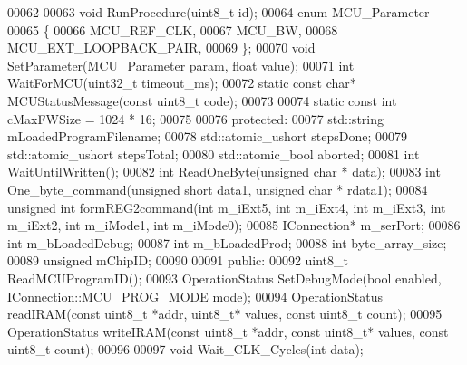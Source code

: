 \begin{DoxyCode}
00062 
00063         \textcolor{keywordtype}{void} RunProcedure(uint8\_t \textcolor{keywordtype}{id});
00064         \textcolor{keyword}{enum} MCU_Parameter
00065         \{
00066             MCU_REF_CLK,
00067             MCU_BW,
00068             MCU_EXT_LOOPBACK_PAIR,
00069         \};
00070         \textcolor{keywordtype}{void} SetParameter(MCU_Parameter param, \textcolor{keywordtype}{float} value);
00071         \textcolor{keywordtype}{int} WaitForMCU(uint32\_t timeout_ms);
00072         \textcolor{keyword}{static} \textcolor{keyword}{const} \textcolor{keywordtype}{char}* MCUStatusMessage(\textcolor{keyword}{const} uint8\_t code);
00073 
00074         \textcolor{keyword}{static} \textcolor{keyword}{const} \textcolor{keywordtype}{int} cMaxFWSize = 1024 * 16;
00075 
00076     \textcolor{keyword}{protected}:
00077         std::string mLoadedProgramFilename;
00078         std::atomic\_ushort stepsDone;
00079         std::atomic\_ushort stepsTotal;
00080         std::atomic\_bool aborted;
00081         \textcolor{keywordtype}{int} WaitUntilWritten();
00082         \textcolor{keywordtype}{int} ReadOneByte(\textcolor{keywordtype}{unsigned} \textcolor{keywordtype}{char} * data);
00083         \textcolor{keywordtype}{int} One_byte_command(\textcolor{keywordtype}{unsigned} \textcolor{keywordtype}{short} data1, \textcolor{keywordtype}{unsigned} \textcolor{keywordtype}{char} * rdata1);
00084         \textcolor{keywordtype}{unsigned} \textcolor{keywordtype}{int} formREG2command(\textcolor{keywordtype}{int} m\_iExt5, \textcolor{keywordtype}{int} m\_iExt4, \textcolor{keywordtype}{int} m\_iExt3, \textcolor{keywordtype}{int} m\_iExt2, \textcolor{keywordtype}{int} m\_iMode1, \textcolor{keywordtype}{int} 
      m\_iMode0);
00085         IConnection* m_serPort;
00086         \textcolor{keywordtype}{int} m_bLoadedDebug;
00087         \textcolor{keywordtype}{int} m_bLoadedProd;
00088         \textcolor{keywordtype}{int} byte_array_size;
00089         \textcolor{keywordtype}{unsigned} mChipID;
00090 
00091     \textcolor{keyword}{public}:
00092         uint8\_t ReadMCUProgramID();
00093         OperationStatus SetDebugMode(\textcolor{keywordtype}{bool} enabled, IConnection::MCU_PROG_MODE 
      mode);
00094         OperationStatus readIRAM(\textcolor{keyword}{const} uint8\_t *addr, uint8\_t* values, \textcolor{keyword}{const} uint8\_t 
      count);
00095         OperationStatus writeIRAM(\textcolor{keyword}{const} uint8\_t *addr, \textcolor{keyword}{const} uint8\_t* values, \textcolor{keyword}{const} uint8\_t 
      count);
00096 
00097         \textcolor{keywordtype}{void} Wait_CLK_Cycles(\textcolor{keywordtype}{int} data);

\end{DoxyCode}
